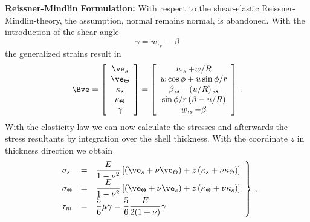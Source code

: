 {\bf Reissner-Mindlin Formulation:} 
With respect to the shear-elastic Reissner-Mindlin-theory, 
the assumption, normal remains normal, is abandoned. 
With the introduction of the shear-angle 
\begin{equation}
\gamma = w,_s - \beta
\end{equation}
the generalized strains result in
\begin{equation}
\Bve = 
\left[ 
\begin{array}{c}
\ve_s \\ \ve_\Theta \\ \kappa_s \\ \kappa_\Theta \\ \gamma
\end{array}
\right] = \left[ 
\begin{array}{c}
u,_s + w/R \\
w \cos \phi + u \sin \phi/r \\
  \beta,_s - \left( u/R \right),_s \\
  \sin \phi/r \left( \beta - u/R \right) \\
w,_s - \beta
\end{array}
\right] \, . 
\end{equation}
With the elasticity-law we can now calculate the stresses 
and afterwards the stress resultants by integration over 
the shell thickness. 
With the coordinate $z$ in thickness direction we obtain 
\begin{eqnarray}
\left.
\begin{array}{lcl}
\sigma_s & = & \dfrac{E}{1-\nu^2} \left[ \left( \ve_s 
     + \nu \ve_\Theta \right) 
     + z \left( \kappa_s 
     + \nu \kappa_\Theta \right) \right] \\
\sigma_\Theta & = & \dfrac{E}{1-\nu^2} \left[ \left( \ve_\Theta 
     + \nu \ve_s \right) 
     + z \left( \kappa_\Theta + \nu \kappa_s \right) \right] \\
\tau_m & = & \dfrac{5}{6} \mu \gamma 
           = \dfrac{5}{6} \dfrac{E}{2(1+\nu)} \gamma
\end{array}
\right\} \, , 
\end{eqnarray}
